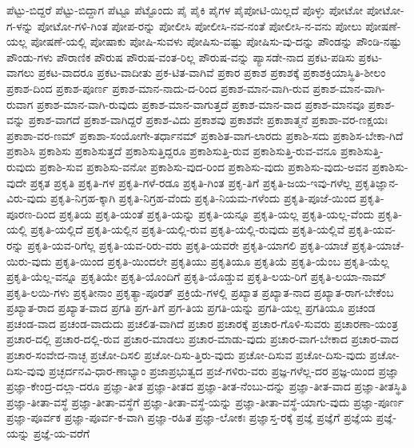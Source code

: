 {ಪೆಟ್ಟು-ಬಿದ್ದರೆ
ಪೆಟ್ಟು-ಬಿದ್ದಾಗ
ಪೆಟ್ಟೂ
ಪೆಟ್ಟೊಂದು
ಪೈ
ಪೈಕಿ
ಪೈಗಳ
ಪೈಪೋಟಿ-ಯಿಲ್ಲದೆ
ಪೊಳ್ಳು
ಪೋಟೋ
ಪೋಟೋ-ಗ-ಳನ್ನು
ಪೋಟೋ-ಗಳಿ-ಗಿಂತ
ಪೋಪ-ರನ್ನು
ಪೋಲೀಸಿ
ಪೋಲೀಸಿ-ನವ-ನಂತೆ
ಪೋಲೀಸಿ-ನ-ವನು
ಪೋಲು
ಪೋಷಣೆ-ಯಲ್ಲ
ಪೋಷಣೆ-ಯಲ್ಲಿ
ಪೋಷಾಕು
ಪೋಷಿ-ಸುವಳು
ಪೋಷಿಸು-ವಷ್ಟು
ಪೋಷಿಸು-ವು-ದನ್ನು
ಪೌಂಡನ್ನು
ಪೌಂಡಿ-ನಷ್ಟು
ಪೌಂಡು-ಗಳು
ಪೌರಾಣಿಕ
ಪೌರುಷ
ಪೌರುಷ-ವಂತ-ರಿಲ್ಲ
ಪೌರುಷ-ವನ್ನು
ಪ್ಯಾಸಡೇ-ನಾದ
ಪ್ರಕಟ-ಪಡಿಸು
ಪ್ರಕಟ-ವಾಗಲು
ಪ್ರಕಟ-ವಾದರೂ
ಪ್ರಕಟ-ವಾದೀತು
ಪ್ರಕ-ಟಿತ-ವಾಗಿವೆ
ಪ್ರಕಾರ
ಪ್ರಕಾಶ
ಪ್ರಕಾಶಕ್ಕೆ
ಪ್ರಕಾಶಕ್ರಿಯಾಸ್ಥಿತಿ-ಶೀಲಂ
ಪ್ರಕಾಶ-ದಿಂದ
ಪ್ರಕಾಶ-ಪೂರ್ಣ
ಪ್ರಕಾಶ-ಮಾನ-ನಾದು-ದ-ರಿಂದ
ಪ್ರಕಾಶ-ಮಾನ-ವಾಗಿ-ರುವ
ಪ್ರಕಾಶ-ಮಾನ-ವಾಗಿ-ರುವಾಗ
ಪ್ರಕಾಶ-ಮಾನ-ವಾಗಿ-ರುವುದು
ಪ್ರಕಾಶ-ಮಾನ-ವಾಗುತ್ತದೆ
ಪ್ರಕಾಶ-ಮಾನ-ವಾದ
ಪ್ರಕಾಶ-ಮಾನವೂ
ಪ್ರಕಾಶ-ವನ್ನು
ಪ್ರಕಾಶ-ವಾಗದೆ
ಪ್ರಕಾಶ-ವಾಗಿದ್ದರೆ
ಪ್ರಕಾಶ-ವಿದು
ಪ್ರಕಾಶವು
ಪ್ರಕಾಶವೇ
ಪ್ರಕಾಶಾತ್ಮನೆ
ಪ್ರಕಾಶಾ-ವರ-ಣಕ್ಷಯಃ
ಪ್ರಕಾಶಾ-ವರ-ಣಮ್
ಪ್ರಕಾಶಾ-ಸಂಯೋಗೇ-ತರ್ಧಾನಮ್
ಪ್ರಕಾಶಿತ-ವಾಗ-ಲಾರದು
ಪ್ರಕಾಶಿ-ಸದು
ಪ್ರಕಾಶಿಸ-ಬೇಕಾ-ಗಿದೆ
ಪ್ರಕಾಶಿಸಿ
ಪ್ರಕಾಶಿಸು
ಪ್ರಕಾಶಿಸುತ್ತದೆ
ಪ್ರಕಾಶಿಸುತ್ತಿದ್ದರೂ
ಪ್ರಕಾಶಿಸುತ್ತಿ-ರುವ
ಪ್ರಕಾಶಿಸುತ್ತಿ-ರುವ-ವನೂ
ಪ್ರಕಾಶಿಸುತ್ತಿ-ರುವುದು
ಪ್ರಕಾಶಿ-ಸುವ
ಪ್ರಕಾಶಿಸು-ವನೋ
ಪ್ರಕಾಶಿಸು-ವುದ-ರಿಂದ
ಪ್ರಕಾಶಿಸು-ವುದು
ಪ್ರಕಾಶಿಸು-ವುದು-ಅವನ
ಪ್ರಕಾಶಿಸು-ವುದೇ
ಪ್ರಕೃತ
ಪ್ರಕೃತಿ
ಪ್ರಕೃತಿ-ಗಳ
ಪ್ರಕೃತಿ-ಗಳೆ-ರಡೂ
ಪ್ರಕೃತಿ-ಗಿಂತ
ಪ್ರಕೃ-ತಿಗೆ
ಪ್ರಕೃತಿ-ಜಯ-ಇವು-ಗಳೆಲ್ಲ
ಪ್ರಕೃತಿಜ್ಞಾನ-ವಿರು-ವುದು
ಪ್ರಕೃತಿ-ನಿಗ್ರಹ-ಕ್ಕಾಗಿ
ಪ್ರಕೃತಿ-ನಿಗ್ರಹ-ವೆಂದು
ಪ್ರಕೃತಿ-ನಿಯಮ-ಗಳೆಂದು
ಪ್ರಕೃತಿ-ಪೂಜೆ-ಯಿಂದ
ಪ್ರಕೃತಿ-ಪೂರಣ-ದಿಂದ
ಪ್ರಕೃತಿಯ
ಪ್ರಕೃತಿ-ಯಂತೆ
ಪ್ರಕೃತಿ-ಯನ್ನು
ಪ್ರಕೃತಿ-ಯನ್ನೂ
ಪ್ರಕೃತಿ-ಯಲ್ಲ
ಪ್ರಕೃತಿ-ಯಲ್ಲ-ವೆಂದು
ಪ್ರಕೃತಿ-ಯಲ್ಲಿ
ಪ್ರಕೃತಿ-ಯಲ್ಲಿದೆ
ಪ್ರಕೃತಿ-ಯಲ್ಲಿನ
ಪ್ರಕೃತಿ-ಯಲ್ಲಿ-ರುವ
ಪ್ರಕೃತಿ-ಯಲ್ಲಿ-ರುವುದು
ಪ್ರಕೃತಿ-ಯಲ್ಲಿವೆ
ಪ್ರಕೃತಿ-ಯವ-ರನ್ನು
ಪ್ರಕೃತಿ-ಯವ-ರಿಗೆಲ್ಲ
ಪ್ರಕೃತಿ-ಯವ-ರಿರು-ವರು
ಪ್ರಕೃತಿ-ಯವರೇ
ಪ್ರಕೃತಿ-ಯಾಗಲಿ
ಪ್ರಕೃತಿ-ಯಾಚೆ
ಪ್ರಕೃತಿ-ಯಾಚೆ-ಯಿರು-ವುದು
ಪ್ರಕೃತಿ-ಯಿಂದ
ಪ್ರಕೃತಿ-ಯಿಂದಲೇ
ಪ್ರಕೃತಿಯು
ಪ್ರಕೃತಿಯೂ
ಪ್ರಕೃತಿಯೆ
ಪ್ರಕೃತಿ-ಯೆಂಬ
ಪ್ರಕೃತಿ-ಯೆಲ್ಲ
ಪ್ರಕೃತಿ-ಯೆಲ್ಲ-ವನ್ನೂ
ಪ್ರಕೃತಿಯೇ
ಪ್ರಕೃತಿ-ಯೊಂದಿಗೆ
ಪ್ರಕೃತಿ-ಯೊಡ್ಡುವ
ಪ್ರಕೃತಿ-ಲಯ-ರಿಗೆ
ಪ್ರಕೃತಿ-ಲಯಾ-ನಾಮ್
ಪ್ರಕೃತಿ-ಲಯಿ-ಗಳು
ಪ್ರಕೃತೀನಾಂ
ಪ್ರಕೃತ್ಯಾ-ಪೂರತ್
ಪ್ರಕ್ರಿಯೆ-ಗಳಲ್ಲಿ
ಪ್ರಖ್ಯಾತ
ಪ್ರಖ್ಯಾತ-ನಾದ
ಪ್ರಖ್ಯಾತ-ರಾಗ-ಬೇಕೆಂಬ
ಪ್ರಖ್ಯಾತ-ರಾದ
ಪ್ರಖ್ಯಾತ-ವಾದ
ಪ್ರಗತಿ
ಪ್ರಗ-ತಿಗೆ
ಪ್ರಗ-ತಿಯ
ಪ್ರಗತಿ-ಯನ್ನು
ಪ್ರಗತಿ-ಯಲ್ಲ
ಪ್ರಗತಿಯೂ
ಪ್ರಚಂಡ
ಪ್ರಚಂಡ-ವಾದ
ಪ್ರಚಂಡ-ವಾದುದು
ಪ್ರಚಲಿತ-ವಾಗಿದೆ
ಪ್ರಚಾರ
ಪ್ರಚಾರಕ್ಕೆ
ಪ್ರಚಾರ-ಗೊಳಿ-ಸುವರು
ಪ್ರಚಾರಣಾ-ಯಂತ್ರ
ಪ್ರಚಾರ-ದಲ್ಲಿ
ಪ್ರಚಾರ-ದಲ್ಲಿ-ರುವ
ಪ್ರಚಾರ-ಮಾಡಲು
ಪ್ರಚಾರ-ಮಾಡು-ವುದು
ಪ್ರಚಾರ-ವಾಗ-ಬೇಕಾದ
ಪ್ರಚಾರ-ವಾದ
ಪ್ರಚಾರ-ಸಂವೇದ-ನಾಚ್ಛ
ಪ್ರಚೋ-ದಿಸಲಿ
ಪ್ರಚೋ-ದಿಸು-ತ್ತಿರು-ವುದು
ಪ್ರಚೋ-ದಿಸುವ
ಪ್ರಚೋ-ದಿಸು-ವುದು
ಪ್ರಚೋ-ದಿಸು-ವುವು
ಪ್ರಚ್ಛರ್ದನವಿ-ಧಾರ-ಣಾಭ್ಯಾಂ
ಪ್ರಜಾಪ್ರಭುತ್ವದ
ಪ್ರಜೆ-ಗಳಿರು-ವರು
ಪ್ರಜ್ಞ-ಗಳೆಲ್ಲ-ದರ
ಪ್ರಜ್ಞ-ಯಿಂದ
ಪ್ರಜ್ಞಾ
ಪ್ರಜ್ಞಾ-ಕೇಂದ್ರ-ದಲ್ಲಾ-ದರೂ
ಪ್ರಜ್ಞಾ-ತೀತ
ಪ್ರಜ್ಞಾ-ತೀತದ
ಪ್ರಜ್ಞಾ-ತೀತ-ನೆಂಬು-ದನ್ನು
ಪ್ರಜ್ಞಾ-ತೀತ-ವಾದ
ಪ್ರಜ್ಞಾ-ತೀತಸ್ಥಿತಿ
ಪ್ರಜ್ಞಾ-ತೀತಾ-ವಸ್ಥೆ
ಪ್ರಜ್ಞಾ-ತೀತಾ-ವಸ್ಥೆಗೆ
ಪ್ರಜ್ಞಾ-ತೀತಾ-ವಸ್ಥೆ-ಯನ್ನು
ಪ್ರಜ್ಞಾ-ತೀತಾ-ವಸ್ಥೆ-ಯಾಗು-ವುದು
ಪ್ರಜ್ಞಾ-ಪೂರ್ಣ
ಪ್ರಜ್ಞಾ-ಪೂರ್ವಕ
ಪ್ರಜ್ಞಾ-ಪೂರ್ವ-ಕ-ವಾಗಿ
ಪ್ರಜ್ಞಾ-ರಹಿತ
ಪ್ರಜ್ಞಾ-ಲೋಕಃ
ಪ್ರಜ್ಞಾಸ್ತ-ರಕ್ಕೆ
ಪ್ರಜ್ಞೆ
ಪ್ರಜ್ಞೆಗೆ
ಪ್ರಜ್ಞೆಯ
ಪ್ರಜ್ಞೆ-ಯನ್ನು
ಪ್ರಜ್ಞೆ-ಯ-ವರೆಗೆ
}
